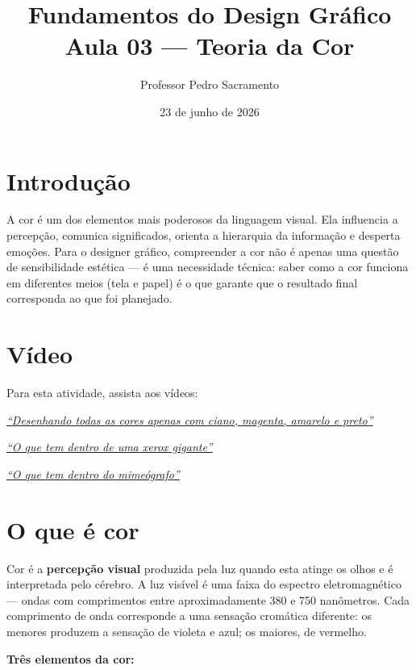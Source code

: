 \documentclass[a4paper,12pt]{article}
\title{\textbf{Fundamentos do Design Gráfico}\\[4pt]\large Aula 03 --- Teoria da Cor}
\author{Professor Pedro Sacramento}
\date{23 de junho de 2026}
\begin{document}
\maketitle

\section{Introdução}

A cor é um dos elementos mais poderosos da linguagem visual. Ela influencia a percepção, comunica significados, orienta a hierarquia da informação e desperta emoções. Para o designer gráfico, compreender a cor não é apenas uma questão de sensibilidade estética --- é uma necessidade técnica: saber como a cor funciona em diferentes meios (tela e papel) é o que garante que o resultado final corresponda ao que foi planejado.

\section{Vídeo}

\noindent Para esta atividade, assista aos vídeos:

\begin{center}
\href{https://www.youtube.com/watch?v=XqaUhMvjOFg}{\textit{``Desenhando todas as cores apenas com ciano, magenta, amarelo e preto''}}

\medskip
\href{https://www.youtube.com/watch?v=uwsJtw1T9qk}{\textit{``O que tem dentro de uma xerox gigante''}}

\medskip
\href{https://youtu.be/FkEwfLklGvs}{\textit{``O que tem dentro do mimeógrafo''}}
\end{center}

\section{O que é cor}

Cor é a \textbf{percepção visual} produzida pela luz quando esta atinge os olhos e é interpretada pelo cérebro. A luz visível é uma faixa do espectro eletromagnético --- ondas com comprimentos entre aproximadamente 380 e 750 nanômetros. Cada comprimento de onda corresponde a uma sensação cromática diferente: os menores produzem a sensação de violeta e azul; os maiores, de vermelho.

\bigskip
\noindent \textbf{Três elementos da cor:}
\end{document}
